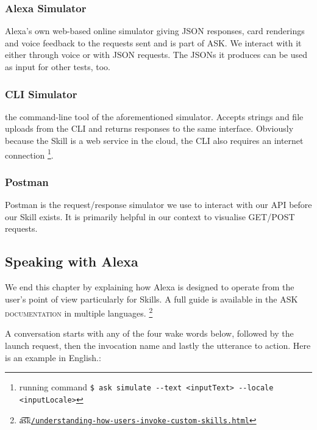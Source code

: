 \subsubsection*{Alexa Simulator}
	Alexa's own web-based online simulator giving JSON responses, card renderings and voice feedback to the requests sent and is part of ASK. We interact with it either through voice or with JSON requests. The JSONs it produces can be used as input for other tests, too. 
	
	\subsubsection*{CLI Simulator}
	the command-line tool of the aforementioned simulator. Accepts strings and file uploads from the CLI and returns responses to the same interface. Obviously because the Skill is a web service in the cloud, the CLI also requires an internet connection \footnote{running command \lstinline|$ ask simulate --text <inputText> --locale <inputLocale>|}.
	
	
	\subsubsection*{Postman}
	Postman is the request/response simulator we use to interact with our API before our Skill exists. It is primarily helpful in our context to visualise GET/POST requests.
	






\subsection*{Speaking with Alexa}


We end this chapter by explaining how Alexa is designed to operate from the user's point of view particularly for Skills. A full guide is available in the \textsc{ASK documentation} in multiple languages. \footnote{\t{a\t{sk}}\href{https://developer.amazon.com/docs/custom-skills/understanding-how-users-invoke-custom-skills.html}{\lstinline|/understanding-how-users-invoke-custom-skills.html|}}

A conversation starts with any of the four wake words below, followed by the launch request, then the invocation name and lastly the utterance to action. Here is an example in English.:


